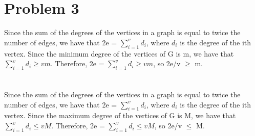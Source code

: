 \documentclass{article}
\begin{document}
\section{Problem 3}
Since the sum of the degrees of the vertices in a graph is equal to twice the number of edges, we have that 2e = $\sum_{i=1}^{v} d_i$, where $d_i$ is the degree of the ith vertex. Since the minimum degree of the vertices of G is m, we have that $\sum_{i=1}^{v} d_i \geq vm$. Therefore, 2e = $\sum_{i=1}^{v} d_i \geq vm$, so 2e/v $\geq$ m.\\
\\ \hspace*{\fill} \\
Since the sum of the degrees of the vertices in a graph is equal to twice the number of edges, we have that 2e = $\sum_{i=1}^{v} d_i$, where $d_i$ is the degree of the ith vertex. Since the maximum degree of the vertices of G is M, we have that $\sum_{i=1}^{v} d_i \leq vM$. Therefore, 2e = $\sum_{i=1}^{v} d_i \leq vM$, so 2e/v $\leq$ M.\\
\end{document}
